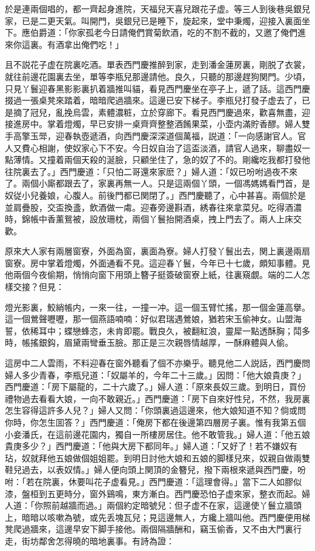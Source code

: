 於是連兩個唱的，都一齊起身進院，天福兒天喜兒跟花子虚。等三人到後巷吳銀兒家，已是二更天氣。叫開門，吳銀兒已是睡下，旋起來，堂中秉燭，迎接入裏面坐下。應伯爵道：「你家孤老今日請俺們賞菊飲酒，吃的不割不截的，又邀了俺們進來你這裏。有酒拿出俺們吃！」

且不説花子虚在院裏吃酒。單表西門慶推醉到家，走到潘金蓮房裏，剛脱了衣裳，就往前邊花園裏去坐，單等李瓶兒那邊請他。良久，只聽的那邊趕狗関門。少頃，只見丫鬟迎春黑影影裏扒着牆推叫貓，看見西門慶坐在亭子上，遞了話。這西門慶掇過一張桌凳來踏着，暗暗爬過牆來。這邊已安下梯子。李瓶兒打發子虚去了，已是摘了冠兒，亂挽烏雲，素體濃粧，立於穿廊下。看見西門慶過來，歡喜無盡，迎接進房中。掌着燈燭，早已安排一桌齊齊整整酒餚果菜，小壶内滿貯香醪。婦人雙手高擎玉斝，迎春執壺遞酒，向西門慶深深道個萬福，説道：「一向感謝官人。官人又費心相謝，使奴家心下不安。今日奴自治了這盃淡酒，請官人過來，聊盡奴一點薄情。又撞着兩個天殺的涎臉，只顧坐住了，急的奴了不的。剛纔吃我都打發他往院裏去了。」西門慶道：「只怕二哥還來家麽？」婦人道：「奴已吩咐過夜不來了。兩個小廝都跟去了，家裏再無一人。只是這兩個丫頭，一個馮媽媽看門首，是奴従小兒養娘，心腹人。前後門都已関閉了。」西門慶聽了，心中甚喜。兩個於是並肩疊股，交盃換盞，飲酒做一䖏。迎春旁邊斟酒，綉春往來拿菜兒。吃得酒濃時，錦帳中香薰鴛被，設放珊枕，兩個丫鬟抬開酒桌，拽上門去了。兩人上床交歡。

原來大人家有兩層窗寮，外面為窗，裏面為寮。婦人打發丫鬟出去，関上裏邊兩扇窗寮。房中掌着燈燭，外面通看不見。這迎春丫鬟，今年已十七歲，頗知事體。見他兩個今夜偷期，悄悄向窗下用頭上簪子挺簽破窗寮上紙，往裏窺覷。端的二人怎樣交接？但見：

\begin{myquote}
燈光影裏，鮫綃帳内，一來一往，一撞一冲。這一個玉臂忙搖，那一個金蓮高擧。這一個鶯聲嚦嚦，那一個燕語喃喃：好似君瑞遇鶯娘，猶若宋玉偷神女。山盟海誓，依稀耳中；蝶戀蜂恣，未肯即罷。戰良久，被翻紅浪，靈犀一點透酥胸；鬦多時，帳搖銀鈎，眉黛兩彎垂玉臉。那正是三次親唇情越厚，一酥麻體與人偷。
\end{myquote}

這房中二人雲雨，不料迎春在窗外聽看了個不亦樂乎。聽見他二人説話，西門慶問婦人多少青春，李瓶兒道：「奴屬羊的，今年二十三歲。」因問：「他大娘貴庚？」西門慶道：「房下屬龍的，二十六歲了。」婦人道：「原來長奴三歲。到明日，買份禮物過去看看大娘，一向不敢親近。」西門慶道：「房下自來好性兒，不然，我房裏怎生容得這許多人兒？」婦人又問：「你頭裏過這邊來，他大娘知道不知？倘或問你時，你怎生囬答？」西門慶道：「俺房下都在後邊第四層房子裏。惟有我第五個小妾潘氏，在這前邊花園内，獨自一所樓房居住。他不敢管我。」婦人道：「他五娘貴庚多少？」西門慶道：「他與大房下都同年。」婦人道：「又好了！若不嫌奴有玷，奴就拜他五娘做個姐姐罷。到明日討他大娘和五娘的脚樣兒來，奴親自做兩雙鞋兒過去，以表奴情。」婦人便向頭上関頂的金簪兒，撥下兩根來遞與西門慶，吩咐：「若在院裏，休要叫花子虚看見。」西門慶道：「這理會得。」當下二人如膠似漆，盤桓到五更時分，窗外鷄鳴，東方漸白。西門慶恐怕子虚來家，整衣而起。婦人道：「你照前越牆而過。」兩個約定暗號兒：但子虚不在家，這邊使丫鬟立牆頭上，暗暗以咳嗽為號，或先丢塊瓦兒；見這邊無人，方纔上牆叫他。西門慶便用梯凳爬過牆來，這邊早安下脚手接他。兩個隔牆酬和，竊玉偷香，又不由大門裏行走，街坊鄰舍怎得曉的暗地裏事。有詩為證：

